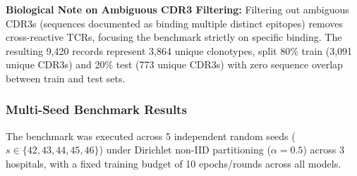 \documentclass[11pt,a4paper]{article}
\begin{document}
\noindent\textbf{Biological Note on Ambiguous CDR3 Filtering:} Filtering out ambiguous CDR3s (sequences documented as binding multiple distinct epitopes) removes cross-reactive TCRs, focusing the benchmark strictly on specific binding. The resulting 9{,}420 records represent 3{,}864 unique clonotypes, split 80\% train (3{,}091 unique CDR3s) and 20\% test (773 unique CDR3s) with zero sequence overlap between train and test sets.

\subsubsection{Multi-Seed Benchmark Results}
The benchmark was executed across 5 independent random seeds ($s \in \{42, 43, 44, 45, 46\}$) under Dirichlet non-IID partitioning ($\alpha=0.5$) across 3 hospitals, with a fixed training budget of 10 epochs/rounds across all models.
\end{document}
